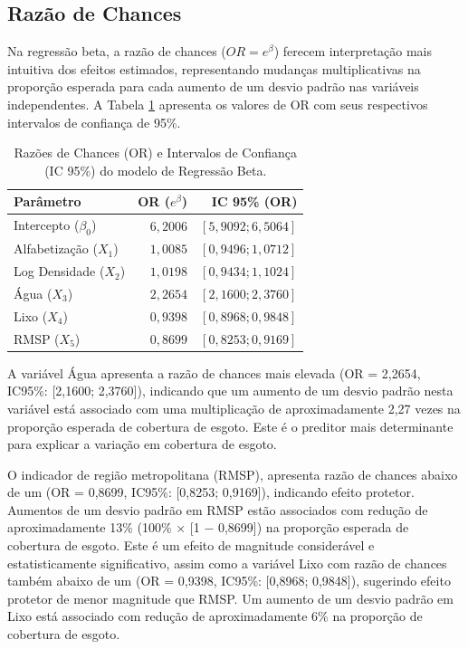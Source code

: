 \documentclass[12pt, a4paper]{article}
\begin{document}
\subsection{Razão de Chances}

Na regressão beta, a razão de chances ($OR = e^\beta$) ferecem interpretação mais intuitiva dos efeitos estimados, representando mudanças multiplicativas na proporção esperada para cada aumento de um desvio padrão nas variáveis independentes. A Tabela \ref{tab:odds_ratios} apresenta os valores de OR com seus respectivos intervalos de confiança de 95\%.

\begin{table}[H]
\centering
\caption{Razões de Chances (OR) e Intervalos de Confiança (IC 95\%) do modelo de Regressão Beta.}
\label{tab:odds_ratios}
\begin{tabular}{lrr}
\toprule
\textbf{Parâmetro} & \textbf{OR ($e^\beta$)} & \textbf{IC 95\% (OR)} \\
\midrule
Intercepto ($\beta_0$) & $6,2006$ & $[5,9092; 6,5064]$ \\
Alfabetização ($X_1$)  & $1,0085$ & $[0,9496; 1,0712]$ \\
Log Densidade ($X_2$)  & $1,0198$ & $[0,9434; 1,1024]$ \\
Água ($X_3$)           & $2,2654$ & $[2,1600; 2,3760]$ \\
Lixo ($X_4$)           & $0,9398$ & $[0,8968; 0,9848]$ \\
RMSP ($X_5$)           & $0,8699$ & $[0,8253; 0,9169]$ \\
\bottomrule
\end{tabular}
\end{table}

A variável Água apresenta a razão de chances mais elevada (OR = 2,2654, IC95\%: [2,1600; 2,3760]), indicando que um aumento de um desvio padrão nesta variável está associado com uma multiplicação de aproximadamente 2,27 vezes na proporção esperada de cobertura de esgoto. Este é o preditor mais determinante para explicar a variação em cobertura de esgoto.

O indicador de região metropolitana (RMSP), apresenta razão de chances abaixo de um (OR = 0,8699, IC95\%: [0,8253; 0,9169]), indicando efeito protetor. Aumentos de um desvio padrão em RMSP estão associados com redução de aproximadamente 13\% (100\% × [1 − 0,8699]) na proporção esperada de cobertura de esgoto. Este é um efeito de magnitude considerável e estatisticamente significativo, assim como a variável Lixo com razão de chances também abaixo de um (OR = 0,9398, IC95\%: [0,8968; 0,9848]), sugerindo efeito protetor de menor magnitude que RMSP. Um aumento de um desvio padrão em Lixo está associado com redução de aproximadamente 6\% na proporção de cobertura de esgoto.
\end{document}

